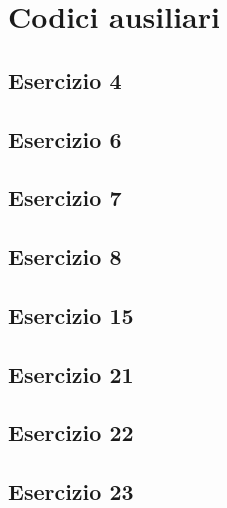 \section{Codici ausiliari}

\subsection{Esercizio 4}


\subsection{Esercizio 6}


\subsection{Esercizio 7}


\subsection{Esercizio 8}


\subsection{Esercizio 15}


\subsection{Esercizio 21}


\subsection{Esercizio 22}


\subsection{Esercizio 23}


